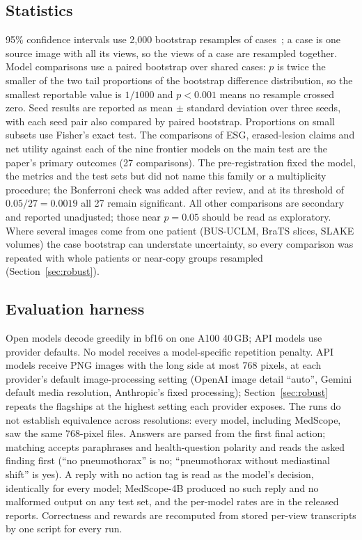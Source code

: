 \documentclass[11pt]{article}
\begin{document}
\subsection{Statistics}\label{sec:stats}
95\% confidence intervals use 2,000 bootstrap resamples of cases~\cite{efron}; a case is one source image with all its views, so the views of a case are resampled together. Model comparisons use a paired bootstrap over shared cases: $p$ is twice the smaller of the two tail proportions of the bootstrap difference distribution, so the smallest reportable value is $1/1000$ and $p<0.001$ means no resample crossed zero. Seed results are reported as mean $\pm$ standard deviation over three seeds, with each seed pair also compared by paired bootstrap. Proportions on small subsets use Fisher's exact test. The comparisons of ESG, erased-lesion claims and net utility against each of the nine frontier models on the main test are the paper's primary outcomes (27 comparisons). The pre-registration fixed the model, the metrics and the test sets but did not name this family or a multiplicity procedure; the Bonferroni check was added after review, and at its threshold of $0.05/27=0.0019$ all 27 remain significant. All other comparisons are secondary and reported unadjusted; those near $p=0.05$ should be read as exploratory. Where several images come from one patient (BUS-UCLM, BraTS slices, SLAKE volumes) the case bootstrap can understate uncertainty, so every comparison was repeated with whole patients or near-copy groups resampled (Section~\ref{sec:robust}).

\subsection{Evaluation harness}
Open models decode greedily in bf16 on one A100 40\,GB; API models use provider defaults. No model receives a model-specific repetition penalty. API models receive PNG images with the long side at most 768 pixels, at each provider's default image-processing setting (OpenAI image detail ``auto'', Gemini default media resolution, Anthropic's fixed processing); Section~\ref{sec:robust} repeats the flagships at the highest setting each provider exposes. The runs do not establish equivalence across resolutions: every model, including MedScope, saw the same 768-pixel files. Answers are parsed from the first final action; matching accepts paraphrases and health-question polarity and reads the asked finding first (``no pneumothorax'' is no; ``pneumothorax without mediastinal shift'' is yes). A reply with no action tag is read as the model's decision, identically for every model; MedScope-4B produced no such reply and no malformed output on any test set, and the per-model rates are in the released reports. Correctness and rewards are recomputed from stored per-view transcripts by one script for every run.
\end{document}
